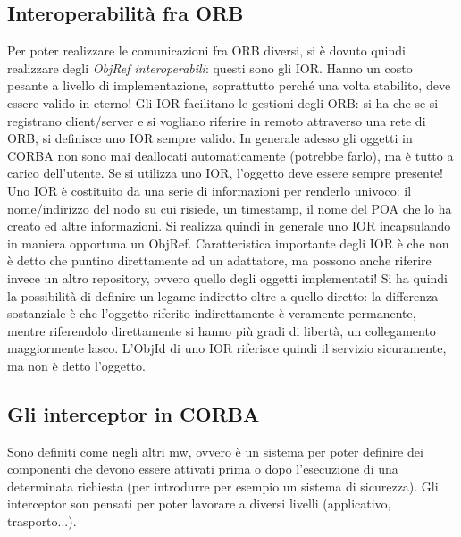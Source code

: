 \subsection{Interoperabilità fra ORB}
Per poter realizzare le comunicazioni fra ORB diversi, si è dovuto quindi realizzare degli \textit{ObjRef 
interoperabili}: questi sono gli IOR. Hanno un costo pesante a livello di implementazione, soprattutto perché una volta 
stabilito, deve essere valido in eterno!
Gli IOR facilitano le gestioni degli ORB: si ha che se si registrano client/server e si vogliano riferire in remoto 
attraverso una rete di ORB, si definisce uno IOR sempre valido. In generale adesso gli oggetti in CORBA non sono mai 
deallocati automaticamente (potrebbe farlo), ma è tutto a carico dell'utente. Se si utilizza uno IOR, l'oggetto deve 
essere sempre presente!
Uno IOR è costituito da una serie di informazioni per renderlo univoco: il nome/indirizzo del nodo su cui risiede, un
timestamp, il nome del POA che lo ha creato ed altre informazioni. Si realizza quindi in generale uno IOR incapsulando
in maniera opportuna un ObjRef.
Caratteristica importante degli IOR è che non è detto che puntino direttamente ad un adattatore, ma possono anche 
riferire invece un altro repository, ovvero quello degli oggetti implementati! Si ha quindi la possibilità di
definire un legame indiretto oltre a quello diretto: la differenza sostanziale è che l'oggetto riferito indirettamente è
veramente permanente, mentre riferendolo direttamente si hanno più gradi di libertà, un collegamento maggiormente
lasco. L'ObjId di uno IOR riferisce quindi il servizio sicuramente, ma non è detto l'oggetto.
\subsection{Gli interceptor in CORBA}
Sono definiti come negli altri mw, ovvero è un sistema per poter definire dei componenti che devono essere attivati 
prima o dopo l'esecuzione di una determinata richiesta (per introdurre per esempio un sistema di sicurezza). Gli 
interceptor son pensati per poter lavorare a diversi livelli (applicativo, trasporto...).
